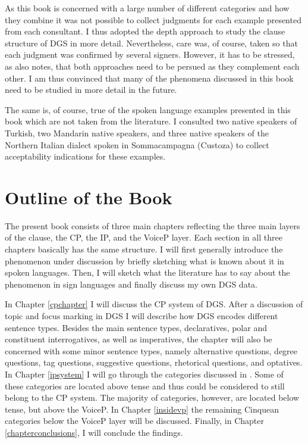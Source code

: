 As this book is concerned with a large number of different categories and how they combine it was not possible to collect judgments for each example presented from each consultant. I thus adopted the depth approach to study the clause structure of DGS in more detail. Nevertheless, care was, of course, taken so that each judgment was confirmed by several signers. However, it has to be stressed, as \citet{zyman2012two} also notes, that both approaches need to be persued as they complement each other. I am thus convinced that many of the phenomena discussed in this book need to be studied in more detail in the future. 

The same is, of course, true of the spoken language examples presented in this book which are not taken from the literature. I consulted two native speakers of Turkish, two Mandarin native speakers, and three native speakers of the Northern Italian dialect spoken in Sommacampagna (Custoza) to collect acceptability indications for these examples.



\section{Outline of the Book}\label{outlinesection}
The present book consists of three main chapters reflecting the three main layers of the clause, the CP, the IP, and the VoiceP layer. Each section in all three chapters basically has the same structure. I will first generally introduce the phenomenon under discussion by briefly sketching what is known about it in spoken languages. Then, I will sketch what the literature has to say about the phenomenon in sign languages and finally discuss my own DGS data. 

In Chapter \ref{cpchapter} I will discuss the CP system of DGS. After a discussion of topic and focus marking in DGS I will describe how DGS encodes different sentence types. Besides the main sentence types, declaratives, polar and constituent interrogatives, as well as imperatives, the chapter will also be concerned with some minor sentence types, namely alternative questions, degree questions, tag questions, suggestive questions, rhetorical questions, and optatives. In Chapter \ref{ipsystem} I will go through the categories discussed in \citet{cinque1999adverbs, cinque2006restructuring}. Some of these categories are located above tense and thus could be considered to still belong to the CP system. The majority of categories, however, are located below tense, but above the VoiceP. In Chapter \ref{insidevp} the remaining Cinquean categories below the VoiceP layer will be discussed. Finally, in Chapter \ref{chapterconclusions}, I will conclude the findings.

